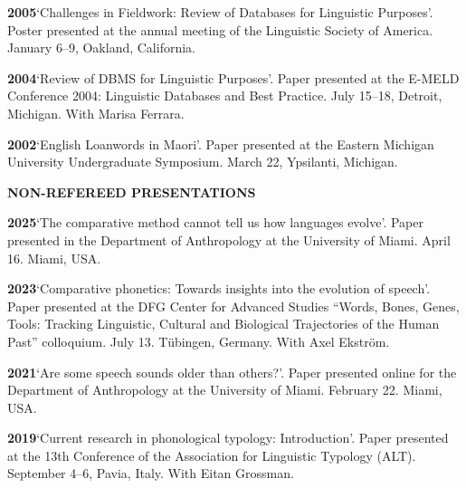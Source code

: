 \documentclass[11pt]{article}
\newcommand{\hangpara}{
 \setlength{\parindent}{0in} %
 \hangindent=0.42in %
}
\begin{document}
\vskip 6pt
\hangpara
{\bf 2005}\hspace{1ex}`Challenges in Fieldwork: Review of Databases for Linguistic Purposes'. Poster presented at the annual meeting of the Linguistic Society of America. January 6--9, Oakland, California.

\vskip 6pt
\hangpara
{\bf 2004}\hspace{1ex}`Review of DBMS for Linguistic Purposes'. Paper presented at the E-MELD Conference 2004: Linguistic Databases and Best Practice. July 15--18, Detroit, Michigan. With Marisa Ferrara.

\vskip 6pt
\hangpara
{\bf 2002}\hspace{1ex}`English Loanwords in Maori'. Paper presented at the Eastern Michigan University Undergraduate Symposium. March 22, Ypsilanti, Michigan.


\vskip 20pt
\begin{flushleft}
{\bf NON-REFEREED PRESENTATIONS}
\end{flushleft}

\hangpara
{\bf 2025}\hspace{1ex}`The comparative method cannot tell us how languages evolve'. Paper presented in the Department of Anthropology at the University of Miami. April 16. Miami, USA.

\hangpara
\vskip 6pt
{\bf 2023}\hspace{1ex}`Comparative phonetics: Towards insights into the evolution of speech'. Paper presented at the DFG Center for Advanced Studies ``Words, Bones, Genes, Tools: Tracking Linguistic, Cultural and Biological Trajectories of the Human Past'' colloquium. July 13. Tübingen, Germany. With Axel Ekström. %

\hangpara
\vskip 6pt
{\bf 2021}\hspace{1ex}`Are some speech sounds older than others?'. Paper presented online for the Department of Anthropology at the University of Miami. February 22. Miami, USA.

\hangpara
\vskip 6pt
{\bf 2019}\hspace{1ex}`Current research in phonological typology: Introduction'. Paper presented at the 13th Conference of the Association for Linguistic Typology (ALT). September 4--6, Pavia, Italy. With Eitan Grossman.
\end{document}
